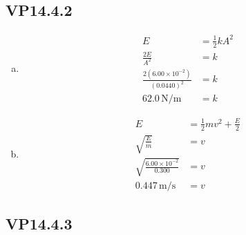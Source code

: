 \documentclass{article}
\begin{document}
\subsection{VP14.4.2}

\begin{enumerate}[a)]
  \item
        \begin{align*}
          E                                         & = \frac{1}{2}kA^2 \\
          \frac{2E}{A^2}                            & = k               \\
          \frac{2(6.00 \times 10^{-2})}{(0.0440)^2} & = k               \\
          62.0 \,\textrm{N/m}                       & = k
        \end{align*}

  \item
        \begin{align*}
          E                                        & = \frac{1}{2}mv^2 + \frac{E}{2} \\
          \sqrt{\frac{E}{m}}                       & = v                             \\
          \sqrt{\frac{6.00 \times 10^{-2}}{0.300}} & = v                             \\
          0.447 \,\textrm{m/s}                     & = v
        \end{align*}
\end{enumerate}

\subsection{VP14.4.3}
\end{document}
